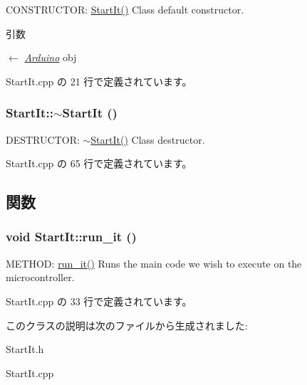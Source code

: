CONSTRUCTOR: \hyperlink{classStartIt_ae7c8fafd44aa73f2f535845e2f98ea86_ae7c8fafd44aa73f2f535845e2f98ea86}{StartIt()} Class default constructor. 
\begin{DoxyParams}{引数}
\item[\mbox{$\leftarrow$} {\em \hyperlink{classArduino}{Arduino}}]obj \end{DoxyParams}


 StartIt.cpp の 21 行で定義されています。\hypertarget{classStartIt_a023b9d2f8412eda996a638d0e3c4c39c_a023b9d2f8412eda996a638d0e3c4c39c}{
\subsubsection[{$\sim$StartIt}]{\setlength{\rightskip}{0pt plus 5cm}StartIt::$\sim$StartIt ()}}
\label{classStartIt_a023b9d2f8412eda996a638d0e3c4c39c_a023b9d2f8412eda996a638d0e3c4c39c}


DESTRUCTOR: \hyperlink{classStartIt_a023b9d2f8412eda996a638d0e3c4c39c_a023b9d2f8412eda996a638d0e3c4c39c}{$\sim$StartIt()} Class destructor. 

 StartIt.cpp の 65 行で定義されています。

\subsection{関数}
\hypertarget{classStartIt_a8a1a2a8f7b8f05e248baa8958bb93967_a8a1a2a8f7b8f05e248baa8958bb93967}{
\subsubsection[{run\_\-it}]{\setlength{\rightskip}{0pt plus 5cm}void StartIt::run\_\-it ()}}
\label{classStartIt_a8a1a2a8f7b8f05e248baa8958bb93967_a8a1a2a8f7b8f05e248baa8958bb93967}
METHOD: \hyperlink{classStartIt_a8a1a2a8f7b8f05e248baa8958bb93967_a8a1a2a8f7b8f05e248baa8958bb93967}{run\_\-it()} Runs the main code we wish to execute on the microcontroller. 

 StartIt.cpp の 33 行で定義されています。

このクラスの説明は次のファイルから生成されました:\begin{DoxyCompactItemize}
\item 
StartIt.h\item 
StartIt.cpp\end{DoxyCompactItemize}
